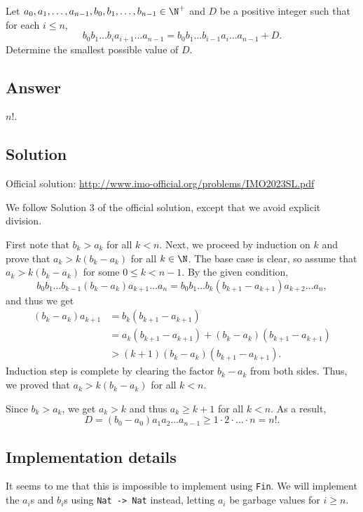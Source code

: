 Let $a_0, a_1, \ldots, a_{n - 1}, b_0, b_1, \ldots, b_{n - 1} \in \N^+$ and $D$ be a positive integer such that for each $i \leq n$,
\[ b_0 b_1 \ldots b_i a_{i + 1} \ldots a_{n - 1} = b_0 b_1 \ldots b_{i - 1} a_i \ldots a_{n - 1} + D. \]
Determine the smallest possible value of $D$.



\subsection*{Answer}

$n!$.



\subsection*{Solution}

Official solution: \url{http://www.imo-official.org/problems/IMO2023SL.pdf}

We follow Solution 3 of the official solution, except that we avoid explicit division.

First note that $b_k > a_k$ for all $k < n$.
Next, we proceed by induction on $k$ and prove that $a_k > k(b_k - a_k)$ for all $k \in \N$.
The base case is clear, so assume that $a_k > k(b_k - a_k)$ for some $0 \leq k < n - 1$.
By the given condition,
\[ b_0 b_1 \ldots b_{k - 1} (b_k - a_k) a_{k + 1} \ldots a_n = b_0 b_1 \ldots b_k (b_{k + 1} - a_{k + 1}) a_{k + 2} \ldots a_n, \]
    and thus we get
\begin{align*}
    (b_k - a_k) a_{k + 1}
    &= b_k (b_{k + 1} - a_{k + 1}) \\
    &= a_k (b_{k + 1} - a_{k + 1}) + (b_k - a_k)(b_{k + 1} - a_{k + 1}) \\
    &> (k + 1)(b_k - a_k)(b_{k + 1} - a_{k + 1}).
\end{align*}
Induction step is complete by clearing the factor $b_k - a_k$ from both sides.
Thus, we proved that $a_k > k(b_k - a_k)$ for all $k < n$.

Since $b_k > a_k$, we get $a_k > k$ and thus $a_k \geq k + 1$ for all $k < n$.
As a result,
\[ D = (b_0 - a_0) a_1 a_2 \ldots a_{n - 1} \geq 1 \cdot 2 \cdot \ldots \cdot n = n!. \]



\subsection*{Implementation details}

It seems to me that this is impossible to implement using \texttt{Fin}.
We will implement the $a_i$s and $b_i$s using \texttt{Nat -> Nat} instead, letting $a_i$ be garbage values for $i \geq n$.
